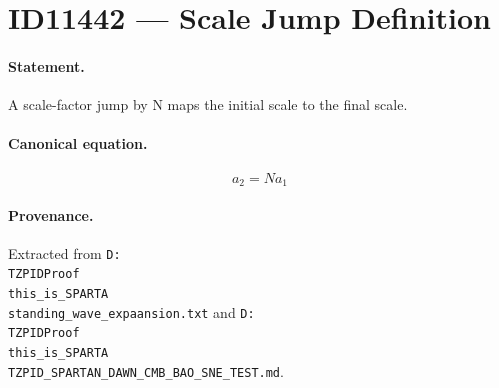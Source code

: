 \section*{ID11442 --- Scale Jump Definition}

\paragraph{Statement.}
A scale-factor jump by N maps the initial scale to the final scale.

\paragraph{Canonical equation.}
\[
a_2=N a_1
\]

\paragraph{Provenance.}
Extracted from \texttt{D:\\TZPIDProof\\this\_is\_SPARTA\\standing\_wave\_expaansion.txt} and \texttt{D:\\TZPIDProof\\this\_is\_SPARTA\\TZPID\_SPARTAN\_DAWN\_CMB\_BAO\_SNE\_TEST.md}.
